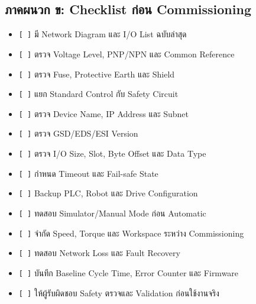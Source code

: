\subsection{ภาคผนวก ข: Checklist ก่อน Commissioning}

\begin{itemize}
    \item \texttt{[ ]} มี Network Diagram และ I/O List ฉบับล่าสุด
    \item \texttt{[ ]} ตรวจ Voltage Level, PNP/NPN และ Common Reference
    \item \texttt{[ ]} ตรวจ Fuse, Protective Earth และ Shield
    \item \texttt{[ ]} แยก Standard Control กับ Safety Circuit
    \item \texttt{[ ]} ตรวจ Device Name, IP Address และ Subnet
    \item \texttt{[ ]} ตรวจ GSD/EDS/ESI Version
    \item \texttt{[ ]} ตรวจ I/O Size, Slot, Byte Offset และ Data Type
    \item \texttt{[ ]} กำหนด Timeout และ Fail-safe State
    \item \texttt{[ ]} Backup PLC, Robot และ Drive Configuration
    \item \texttt{[ ]} ทดสอบ Simulator/Manual Mode ก่อน Automatic
    \item \texttt{[ ]} จำกัด Speed, Torque และ Workspace ระหว่าง Commissioning
    \item \texttt{[ ]} ทดสอบ Network Loss และ Fault Recovery
    \item \texttt{[ ]} บันทึก Baseline Cycle Time, Error Counter และ Firmware
    \item \texttt{[ ]} ให้ผู้รับผิดชอบ Safety ตรวจและ Validation ก่อนใช้งานจริง
\end{itemize}
